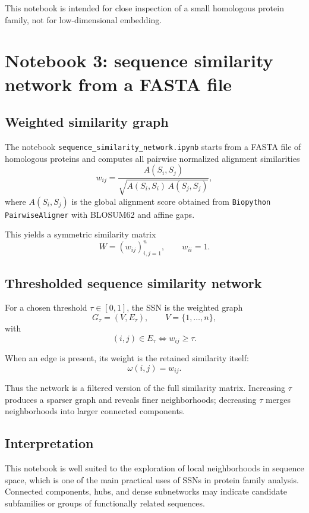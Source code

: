 \documentclass[11pt,a4paper]{article}
\begin{document}
This notebook is intended for close inspection of a small homologous protein family, not for low-dimensional embedding.

\section{Notebook 3: sequence similarity network from a FASTA file}

\subsection{Weighted similarity graph}

The notebook \texttt{sequence\_similarity\_network.ipynb} starts from a FASTA file of homologous proteins and computes all pairwise normalized alignment similarities
\[
w_{ij}=\frac{A(S_i,S_j)}{\sqrt{A(S_i,S_i)\,A(S_j,S_j)}},
\]
where $A(S_i,S_j)$ is the global alignment score obtained from \texttt{Biopython PairwiseAligner} with BLOSUM62 and affine gaps.

This yields a symmetric similarity matrix
\[
W=(w_{ij})_{i,j=1}^n,\qquad w_{ii}=1.
\]

\subsection{Thresholded sequence similarity network}

For a chosen threshold $\tau\in[0,1]$, the SSN is the weighted graph
\[
G_\tau=(V,E_\tau),\qquad V=\{1,\dots,n\},
\]
with
\[
(i,j)\in E_\tau \iff w_{ij}\ge \tau.
\]

When an edge is present, its weight is the retained similarity itself:
\[
\omega(i,j)=w_{ij}.
\]

Thus the network is a filtered version of the full similarity matrix. Increasing $\tau$ produces a sparser graph and reveals finer neighborhoods; decreasing $\tau$ merges neighborhoods into larger connected components.

\subsection{Interpretation}

This notebook is well suited to the exploration of local neighborhoods in sequence space, which is one of the main practical uses of SSNs in protein family analysis. Connected components, hubs, and dense subnetworks may indicate candidate subfamilies or groups of functionally related sequences.
\end{document}
